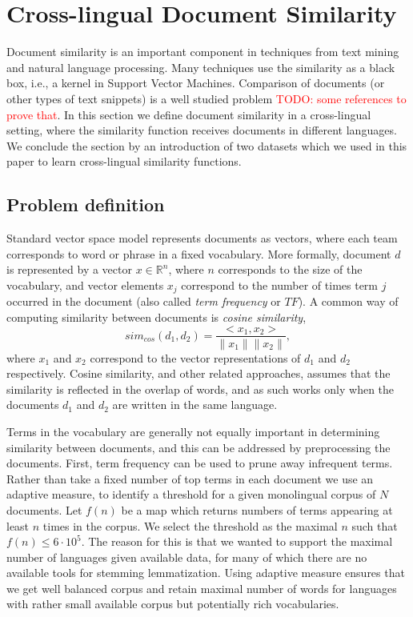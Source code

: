 \documentclass[twoside,11pt]{article}
\newcommand{\todo}[1]{\textcolor{red}{TODO: #1}}
\newcommand{\RR}{\mathbb{R}}
\begin{document}
\section{Cross-lingual Document Similarity}

Document similarity is an important component in techniques from text mining and natural language processing. Many techniques use the similarity as a black box, i.e., a kernel in Support Vector Machines. Comparison of documents (or other types of text snippets) is a well studied problem \todo{some references to prove that}. In this section we define document similarity in a cross-lingual setting, where the similarity function receives documents in different languages. We conclude the section by an introduction of two datasets which we used in this paper to learn cross-lingual similarity functions.

\subsection{Problem definition}


Standard vector space model \cite{xxx} represents documents as vectors, where each team corresponds to word or phrase in a fixed vocabulary. More formally, document $d$ is represented by a vector $x \in \RR^n$, where $n$ corresponds to the size of the vocabulary, and vector elements $x_j$ correspond to the number of times term $j$ occurred in the document (also called \emph{term frequency} or $TF$). A common way of computing similarity between documents is \emph{cosine similarity}, 
$$sim_{cos}(d_1, d_2) = \frac{<x_1, x_2>}{\|x_1\| \|x_2\|},$$
where $x_1$ and $x_2$ correspond to the vector representations of $d_1$ and $d_2$ respectively. Cosine similarity, and other related approaches, assumes that the similarity is reflected in the overlap of words, and as such works only when the documents $d_1$ and $d_2$ are written in the same language.

Terms in the vocabulary are generally not equally important in determining similarity between documents, and this can be addressed by preprocessing the documents. First, term frequency can be used to prune away infrequent terms. Rather than take a fixed number of top terms in each document we use an adaptive measure, to identify a threshold for a given monolingual corpus of $N$ documents. Let $f(n)$ be a map which returns numbers of terms appearing at least $n$ times in the corpus. We select the threshold as the maximal $n$ such that $f(n) \leq 6 \cdot 10^5$. The reason for this is that we wanted to support the maximal number of languages given available data, for many of which there are no available tools for stemming lemmatization. Using adaptive measure ensures that we get well balanced corpus and retain maximal number of words for languages with rather small available corpus but potentially rich vocabularies.
\end{document}
